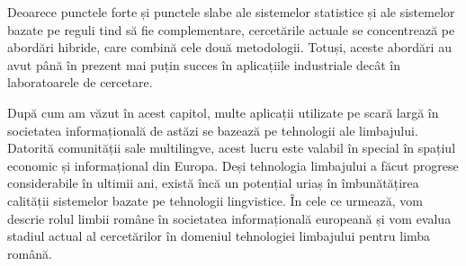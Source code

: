 \begin{multicols}{2}
Deoarece punctele forte și punctele slabe ale sistemelor statistice și ale sistemelor bazate pe reguli tind să fie complementare, cercetările actuale se concentrează pe abordări hibride, care combină cele două metodologii. Totuși, aceste abordări au avut până în prezent mai puțin succes în aplicațiile industriale decât în laboratoarele de cercetare.

După cum am văzut în acest capitol, multe aplicații utilizate pe scară largă în societatea informațională de astăzi se bazează pe tehnologii ale limbajului. Datorită comunității sale multilingve, acest lucru este valabil în special în spațiul economic și informațional din Europa. Deși tehnologia limbajului a făcut progrese considerabile în ultimii ani, există încă un potențial uriaș în îmbunătățirea calității sistemelor bazate pe tehnologii lingvistice. În cele ce urmează, vom descrie rolul limbii române în societatea informațională europeană și vom evalua stadiul actual al cercetărilor în domeniul tehnologiei limbajului pentru limba română. 

\end{multicols}

\clearpage


